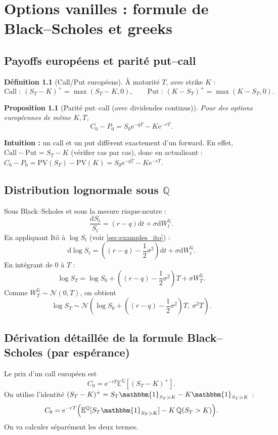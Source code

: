 \documentclass[11pt,a4paper]{report}
\newcommand{\dd}{\mathrm{d}}
\newcommand{\ee}{\mathrm{e}}
\newcommand{\E}{\mathbb{E}}
\newcommand{\Q}{\mathbb{Q}}
\newcommand{\1}{\mathbbm{1}}
\newcommand{\Normal}{\mathcal{N}}
\newcommand{\bracket}[1]{\left[#1\right]}
\theoremstyle{definition}
\newtheorem{definition}{Définition}[chapter]
\theoremstyle{plain}
\newtheorem{proposition}{Proposition}[chapter]
\theoremstyle{remark}
\begin{document}
\chapter{Options vanilles : formule de Black--Scholes et greeks}
\label{chap:bs_greeks}

\section{Payoffs européens et parité put--call}
\begin{definition}[Call/Put européens]
À maturité $T$, avec strike $K$ :
\[
\text{Call : } (S_T-K)^+ = \max(S_T-K,0),\qquad
\text{Put : } (K-S_T)^+ = \max(K-S_T,0).
\]
\end{definition}

\begin{proposition}[Parité put--call (avec dividendes continus)]
Pour des options européennes de même $K,T$,
\[
C_0 - P_0 = S_0 \ee^{-qT} - K\ee^{-rT}.
\]
\end{proposition}

\textbf{Intuition :} un call et un put diffèrent exactement d'un forward.
En effet, $\text{Call}-\text{Put} = S_T-K$ (vérifier cas par cas), donc en actualisant :
$C_0-P_0 = \text{PV}(S_T) - \text{PV}(K) = S_0\ee^{-qT}-K\ee^{-rT}$.

\section{Distribution lognormale sous $\Q$}
Sous Black--Scholes et sous la mesure risque-neutre :
\[
\frac{\dd S_t}{S_t} = (r-q)\dd t + \sigma \dd W_t^{\Q}.
\]
En appliquant Itô à $\log S_t$ (voir \cref{sec:examples_ito}) :
\[
\dd\log S_t = \left((r-q)-\frac12\sigma^2\right)\dd t + \sigma \dd W_t^{\Q}.
\]
En intégrant de $0$ à $T$ :
\[
\log S_T = \log S_0 + \left((r-q)-\frac12\sigma^2\right)T + \sigma W_T^{\Q}.
\]
Comme $W_T^{\Q}\sim \Normal(0,T)$, on obtient
\[
\log S_T \sim \Normal\!\left(\log S_0 + \left((r-q)-\frac12\sigma^2\right)T,\ \sigma^2 T\right).
\]

\section{Dérivation détaillée de la formule Black--Scholes (par espérance)}
\label{sec:derive_bs_expectation}

Le prix d'un call européen est
\[
C_0 = \ee^{-rT}\E^{\Q}\bracket{(S_T-K)^+}.
\]
On utilise l'identité $(S_T-K)^+ = S_T\1_{S_T>K}-K\1_{S_T>K}$ :
\[
C_0 = \ee^{-rT}\Bigl(\E^{\Q}[S_T\1_{S_T>K}] - K\,\Q(S_T>K)\Bigr).
\]
On va calculer séparément les deux termes.
\end{document}
